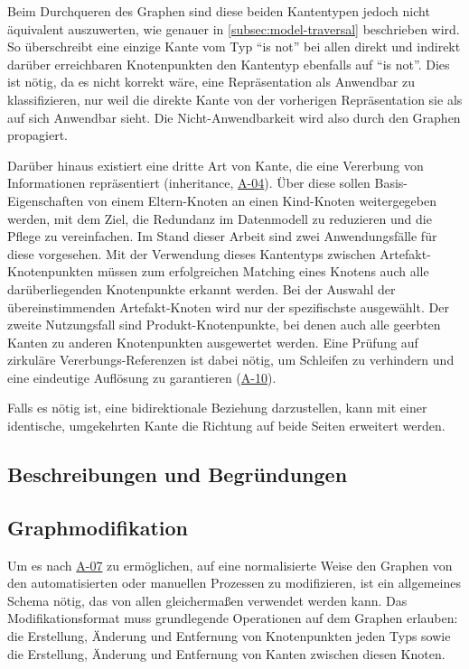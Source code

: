 Beim Durchqueren des Graphen sind diese beiden Kantentypen jedoch nicht äquivalent auszuwerten, wie genauer in \autoref{subsec:model-traversal} beschrieben wird.
So überschreibt eine einzige Kante vom Typ \enquote{is not} bei allen direkt und indirekt darüber erreichbaren Knotenpunkten den Kantentyp ebenfalls auf \enquote{is not}.
Dies ist nötig, da es nicht korrekt wäre, eine Repräsentation als Anwendbar zu klassifizieren, nur weil die direkte Kante von der vorherigen Repräsentation sie als auf sich Anwendbar sieht.
Die Nicht-Anwendbarkeit wird also durch den Graphen propagiert.

Darüber hinaus existiert eine dritte Art von Kante, die eine Vererbung von Informationen repräsentiert (inheritance, \hyperref[subsec:req-selektor-inheritance]{A-04}).
Über diese sollen Basis-Eigenschaften von einem Eltern-Knoten an einen Kind-Knoten weitergegeben werden, mit dem Ziel, die Redundanz im Datenmodell zu reduzieren und die Pflege zu vereinfachen.
Im Stand dieser Arbeit sind zwei Anwendungsfälle für diese vorgesehen.
Mit der Verwendung dieses Kantentyps zwischen Artefakt-Knotenpunkten müssen zum erfolgreichen Matching eines Knotens auch alle darüberliegenden Knotenpunkte erkannt werden.
Bei der Auswahl der übereinstimmenden Artefakt-Knoten wird nur der spezifischste ausgewählt.
Der zweite Nutzungsfall sind Produkt-Knotenpunkte, bei denen auch alle geerbten Kanten zu anderen Knotenpunkten ausgewertet werden.
Eine Prüfung auf zirkuläre Vererbungs-Referenzen ist dabei nötig, um Schleifen zu verhindern und eine eindeutige Auflösung zu garantieren (\hyperref[subsec:req-graph-inner-consistency]{A-10}).

Falls es nötig ist, eine bidirektionale Beziehung darzustellen, kann mit einer identische, umgekehrten Kante die Richtung auf beide Seiten erweitert werden.

\subsection{Beschreibungen und Begründungen}\label{subsec:model-rationale}

\subsection{Graphmodifikation}\label{subsec:model-graph-modification}

Um es nach \hyperref[subsec:req-manual-format-modification]{A-07} zu ermöglichen, auf eine normalisierte Weise den Graphen von den automatisierten oder manuellen Prozessen zu modifizieren, ist ein allgemeines Schema nötig, das von allen gleichermaßen verwendet werden kann.
Das Modifikationsformat muss grundlegende Operationen auf dem Graphen erlauben: die Erstellung, Änderung und Entfernung von Knotenpunkten jeden Typs sowie die Erstellung, Änderung und Entfernung von Kanten zwischen diesen Knoten.


